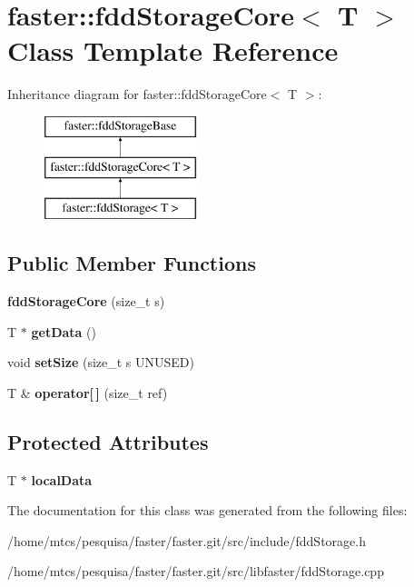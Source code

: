 \hypertarget{classfaster_1_1fddStorageCore}{}\section{faster\+:\+:fdd\+Storage\+Core$<$ T $>$ Class Template Reference}
\label{classfaster_1_1fddStorageCore}
Inheritance diagram for faster\+:\+:fdd\+Storage\+Core$<$ T $>$\+:\begin{figure}[H]
\begin{center}
\leavevmode
\includegraphics[height=3.000000cm]{classfaster_1_1fddStorageCore}
\end{center}
\end{figure}
\subsection*{Public Member Functions}
\begin{DoxyCompactItemize}
\item 
\hypertarget{classfaster_1_1fddStorageCore_aaae0b252366d73dec3995251fdc75920}{}{\bfseries fdd\+Storage\+Core} (size\+\_\+t s)\label{classfaster_1_1fddStorageCore_aaae0b252366d73dec3995251fdc75920}

\item 
\hypertarget{classfaster_1_1fddStorageCore_aa3d19bc27af39d838226ab3e196beb15}{}T $\ast$ {\bfseries get\+Data} ()\label{classfaster_1_1fddStorageCore_aa3d19bc27af39d838226ab3e196beb15}

\item 
\hypertarget{classfaster_1_1fddStorageCore_a6bf9e9e16bdcaf4164ac5a3d28848ec0}{}void {\bfseries set\+Size} (size\+\_\+t s U\+N\+U\+S\+E\+D)\label{classfaster_1_1fddStorageCore_a6bf9e9e16bdcaf4164ac5a3d28848ec0}

\item 
\hypertarget{classfaster_1_1fddStorageCore_ad4608901a31ab093edc8be2a3852a014}{}T \& {\bfseries operator\mbox{[}$\,$\mbox{]}} (size\+\_\+t ref)\label{classfaster_1_1fddStorageCore_ad4608901a31ab093edc8be2a3852a014}

\end{DoxyCompactItemize}
\subsection*{Protected Attributes}
\begin{DoxyCompactItemize}
\item 
\hypertarget{classfaster_1_1fddStorageCore_af2b22b0cda86b521472708991c38b797}{}T $\ast$ {\bfseries local\+Data}\label{classfaster_1_1fddStorageCore_af2b22b0cda86b521472708991c38b797}

\end{DoxyCompactItemize}


The documentation for this class was generated from the following files\+:\begin{DoxyCompactItemize}
\item 
/home/mtcs/pesquisa/faster/faster.\+git/src/include/fdd\+Storage.\+h\item 
/home/mtcs/pesquisa/faster/faster.\+git/src/libfaster/fdd\+Storage.\+cpp\end{DoxyCompactItemize}
